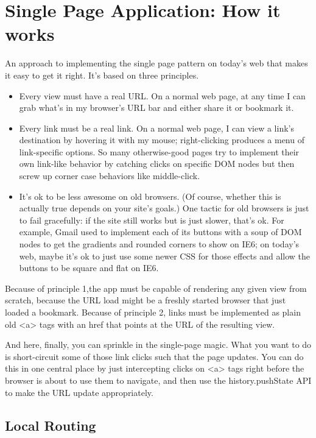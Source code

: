 \section{Single Page Application: How it works}
\label{sec:ARC_function}

An approach to implementing the single page pattern on today's web that makes it easy to get it right. It's based on three principles.
\begin{itemize}
\item Every view must have a real URL. On a normal web page, at any time I can grab what's in my browser's URL bar and either share it or bookmark it.
\item Every link must be a real link. On a normal web page, I can view a link's destination by hovering it with my mouse; right-clicking produces a menu of link-specific options. So many otherwise-good pages try to implement their own link-like behavior by catching clicks on specific DOM nodes but then screw up corner case behaviors like middle-click.
\item It's ok to be less awesome on old browsers. (Of course, whether this is actually true depends on your site's goals.) One tactic for old browsers is just to fail gracefully: if the site still works but is just slower, that's ok. For example, Gmail used to implement each of its buttons with a soup of DOM nodes to get the gradients and rounded corners to show on IE6; on today's web, maybe it's ok to just use some newer CSS for those effects and allow the buttons to be square and flat on IE6.
\end{itemize}

Because of principle 1,the  app must be capable of rendering any given view from scratch, because the URL load might be a freshly started browser that just loaded a bookmark. Because of principle 2, links must be implemented as plain old <a> tags with an href that points at the URL of the resulting view.

And here, finally, you can sprinkle in the single-page magic. What you want to do is short-circuit some of those link clicks such that the page updates. You can do this in one central place by just intercepting clicks on <a> tags right before the browser is about to use them to navigate, and then use the history.pushState API to make the URL update appropriately. \cite{arc_tech}

\subsection{Local Routing}

